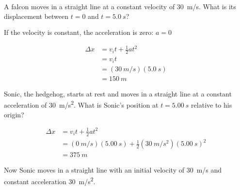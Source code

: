 \documentclass[]{exam}
\theoremstyle{definition}
\begin{document}
\begin{questions}
\question %
A falcon moves in a straight line at a constant velocity of \SI{30}{m/s}. What is its displacement between $t = 0$ and $t = \SI{5.0}{s}$?

\begin{solution}
If the velocity is constant, the acceleration is zero: $a = 0$

\begin{align*}
    \Delta x &= v_i t + \frac{1}{2} a t^2 \\
    &= v_i t \\[1ex] 
    &= (\SI{30}{m/s})(\SI{5.0}{s}) \\[1ex]
    &= \boxed{\SI{150}{m}}
\end{align*}
\end{solution}

\question %
Sonic, the hedgehog, starts at rest and moves in a straight line at a constant acceleration of \SI{30}{m/s^2}. What is Sonic's position at $t = \SI{5.00}{s}$ relative to his origin?

\begin{solution}
    \begin{align*}
        \Delta x &= v_i t +\frac{1}{2}a t^2 \\[1ex]
        &= (\SI{0}{m/s})(\SI{5.00}{s}) + \frac{1}{2}(\SI{30}{m/s^2})(\SI{5.00}{s})^2 \\[1ex]
        &= \boxed{\SI{375}{m}}
    \end{align*}
\end{solution}

\question %
Now Sonic moves in a straight line with an initial velocity of \SI{30}{m/s} and constant acceleration \SI{30}{m/s^2}. 

\end{questions}
\end{document}

